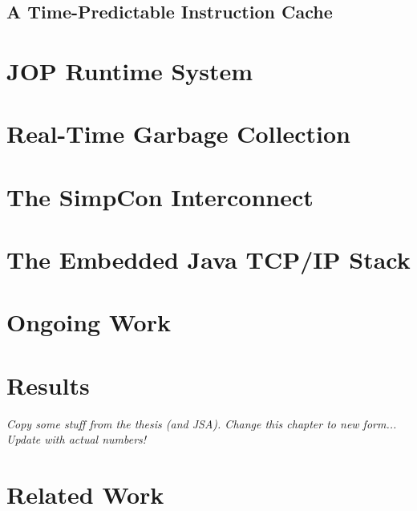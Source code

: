 \clearpage
    
\clearpage
    

\clearpage
    \section{A Time-Predictable Instruction Cache}
    \label{sec:cache}
    

\chapter{JOP Runtime System}
\label{chap:runtime}

    
    
    
    
    
    

\chapter{Real-Time Garbage Collection}
\label{chap:rtgc}
    

\chapter{The SimpCon Interconnect}
\label{chap:simpcon}
\newcommand{\scgrsc}{.65}
\newcommand{\scgrp}{simpcon}



\chapter{The Embedded Java TCP/IP Stack}
\label{chap:ejip}
\newcommand{\grpath}{ejip}


\chapter{Ongoing Work}
\label{chap:ongoing}
    

\chapter{Results}
\emph{Copy some stuff from the thesis (and JSA). Change this chapter
to new form... Update with actual numbers!}

\label{chap:results}
    

\chapter{Related Work}
\label{chap:related}


